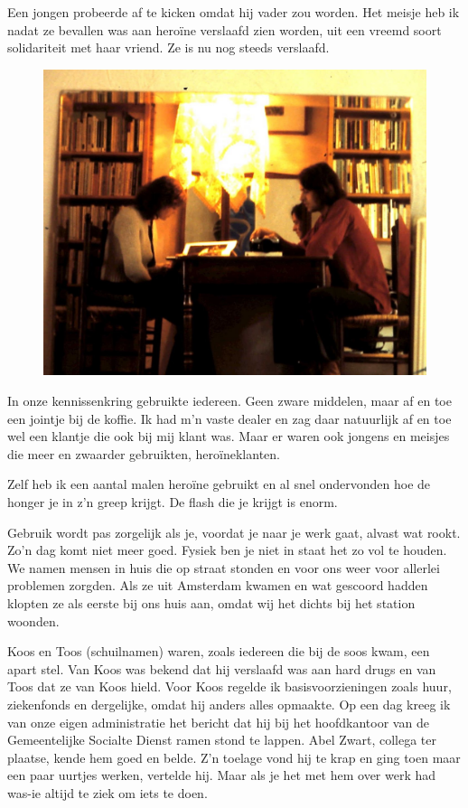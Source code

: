 \documentclass[10pt,twoside, openright]{memoir}
\begin{document}
Een jongen probeerde af te kicken omdat hij vader zou worden. Het meisje heb ik nadat ze bevallen was aan heroïne verslaafd zien worden, uit een vreemd soort solidariteit met haar vriend. Ze is nu nog steeds verslaafd. 

\begin{figure}
\includegraphics[width=\textwidth]{img/ch42/5-5-2009_011a}
\end{figure}

In onze kennissenkring gebruikte iedereen. Geen zware middelen, maar af en toe een jointje bij de koffie. Ik had m’n vaste dealer en zag daar natuurlijk af en toe wel een klantje die ook bij mij klant was. Maar er waren ook jongens en meisjes die meer en zwaarder gebruikten, heroïneklanten. 

Zelf heb ik een aantal malen heroïne gebruikt en al snel ondervonden hoe de honger je in z’n greep krijgt. De flash die je krijgt is enorm.

Gebruik wordt pas zorgelijk als je, voordat je naar je werk gaat, alvast wat rookt. Zo’n dag komt niet meer goed. Fysiek ben je niet in staat het zo vol te houden. We namen mensen in huis die op straat stonden en voor ons weer voor allerlei problemen zorgden. Als ze uit Amsterdam kwamen en wat gescoord hadden klopten ze als eerste bij ons huis aan, omdat wij het dichts bij het station woonden. 

Koos en Toos (schuilnamen) waren, zoals iedereen die bij de soos kwam, een apart stel. Van Koos was bekend dat hij verslaafd was aan hard drugs en van Toos dat ze van Koos hield. Voor Koos regelde ik basisvoorzieningen zoals huur, ziekenfonds en dergelijke, omdat hij anders alles opmaakte. Op een dag kreeg ik van onze eigen administratie het bericht dat hij bij het hoofdkantoor van de Gemeentelijke Socialte Dienst ramen stond te lappen. Abel Zwart, collega ter plaatse, kende hem goed en belde. Z’n toelage vond hij te krap en ging toen maar een paar uurtjes werken, vertelde hij. Maar als je het met hem over werk had was-ie altijd te ziek om iets te doen. 
\end{document}
